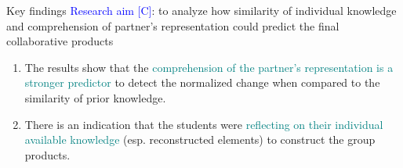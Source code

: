\begin{frame}{Key findings}
    \textcolor{blue}{Research aim [C]}: to analyze how similarity of individual knowledge and comprehension  of partner's representation could predict the final collaborative products
    
    \begin{block}{}
        \begin{enumerate}
            \item The results show that the \textcolor{teal}{comprehension of the partner's representation is a stronger predictor} to detect the normalized change when compared to the similarity of prior knowledge. 
            \item There is an indication that the students were \textcolor{teal}{reflecting on their individual available knowledge} (esp. reconstructed elements) to construct the group products. 
        \end{enumerate}
    \end{block}
\end{frame}



